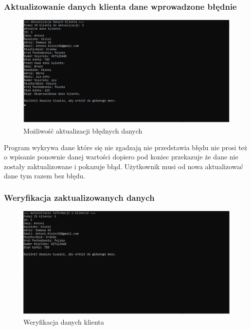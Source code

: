 \subsubsection{Aktualizowanie danych klienta dane wprowadzone błędnie}

\begin{figure}[h]
    \centering
    \includegraphics[width=\textwidth]{AktualizacjaDanychNeg.png}
      \caption{Możliwość aktualizacji błędnych danych}
    \label{fig:example}
\end{figure}

Program wykrywa dane które się nie zgadzają nie przedstawia błędu nie prosi też o wpisanie ponownie danej wartości dopiero pod koniec przekazuje że dane nie zostały zaktualizowane i pokazuje błąd. Użytkownik musi od nowa aktualizować dane tym razem bez błędu. 

\subsubsection{Weryfikacja zaktualizowanych danych}

\begin{figure}[h]
    \centering
    \includegraphics[width=\textwidth]{AktualizacjaDanychWer.png}
      \caption{Weryfikacja danych klienta}
    \label{fig:example}
\end{figure}

